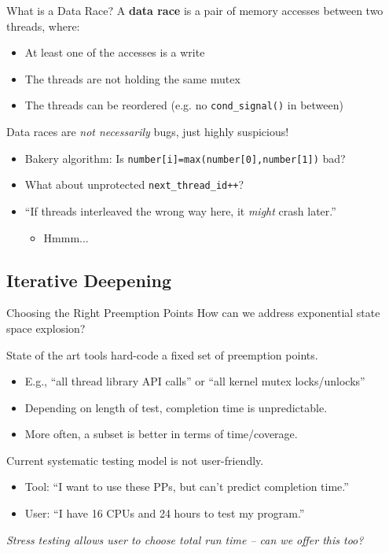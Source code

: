 \documentclass[xcolor=dvipsnames]{beamer}
\begin{document}
\begin{frame}{What is a Data Race?}
	A {\bf data race} is a pair of memory accesses between two threads, where:
	\begin{itemize}
		\item At least one of the accesses is a write
		\item The threads are not holding the same mutex
		\item The threads can be reordered (e.g. no \texttt{cond\_signal()} in between)
	\end{itemize}
	\pause
	\linegap

	Data races are {\em not necessarily} bugs, just highly suspicious!
	\begin{itemize}
		\item Bakery algorithm: Is {\tt number[i]=max(number[0],number[1])} bad?
		\item What about unprotected {\tt next\_thread\_id++}?
		\item ``If threads interleaved the wrong way here, it {\em might} crash later.''
		\begin{itemize}
			\item Hmmm...
		\end{itemize}
	\end{itemize}
\end{frame}


\subsection{Iterative Deepening}

\begin{frame}{Choosing the Right Preemption Points}
	How can we address exponential state space explosion?
	\pause
	\linegap

	State of the art tools hard-code a fixed set of preemption points.
	\begin{itemize}
		\item E.g., ``all thread library API calls'' or ``all kernel mutex locks/unlocks''
		\item Depending on length of test, completion time is unpredictable.
		\item More often, a subset is better in terms of time/coverage. 
	\end{itemize}
	\pause
	\linegap
	Current systematic testing model is not user-friendly.
	\begin{itemize}
		\item Tool: ``I want to use these PPs, but can't predict completion time.''
		\item User: ``I have 16 CPUs and 24 hours to test my program.''
	\end{itemize}
	\linegap
	{\em Stress testing allows user to choose total run time -- can we offer this too?}
\end{frame}
\end{document}
